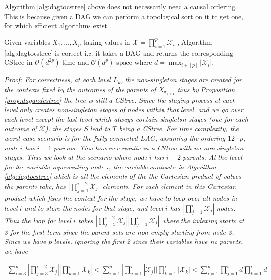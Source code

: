 \documentclass{tufte-book}
\begin{document}
Algorithm \ref{alg:dagtocstree} above does not necessarily need a causal ordering. This is because given a DAG we can perform a topological sort on it to get one, for which efficient algorithms exist \cite{tarjan-1976-edge-disjoin}.

\begin{theorem}\label{thm:dagtocstreecorrectness}
Given variables $X_1,...,X_p$ taking values in $\mathcal{X}=\prod_{i=1}^p \mathcal{X}_i$ , Algorithm \ref{alg:dagtocstree} is correct i.e. it takes a DAG and returns the corresponding CStree in $\mathcal{O}(d^{2p})$ time and $\mathcal{O}(d^p)$ space where $d = \max_{i \in [p]} |\mathcal{X}_i|$.
\end{theorem}

\textit{Proof:
	For correctness, at each level $L_k$, the non-singleton stages are created for the contexts fixed by the outcomes of the parents of $X_{\pi_{k+1}}$ thus by Proposition \ref{prop:dagandcstree} the tree is still a CStree. Since the staging process at each level only creates non-singleton stages of nodes within that level, and we go over each level except the last level which always contain singleton stages (one for each outcome of $\mathcal{X}$), the stages $S$ lead to $T$ being a CStree. For time complexity, the worst case scenario is for the fully connected DAG, assuming the ordering $12\cdots p$, node $i$ has $i-1$ parents. This however results in a CStree with no non-singleton stages. Thus we look at the scenario where node $i$ has $i-2$ parents. At the level for the variable representing node $i$, the variable $contexts$ in Algorithm \ref{alg:dagtocstree} which is all the elements of the the Cartesian product of values the parents take, has $|\prod_{j=1}^{i-2} \mathcal{X}_j|$ elements. For each element in this Cartesian product which fixes the context for the stage, we have to loop over all nodes in level $i$ and to store the nodes for that stage, and level $i$ has $|\prod_{j=1}^i \mathcal{X}_j|$ nodes. Thus the loop for level $i$ takes $|\prod_{j=3}^{i-2} \mathcal{X}_j ||\prod_{j=1}^i \mathcal{X}_j| $ where the indexing starts at 3 for the first term since the parent sets are non-empty starting from node 3. Since we have $p$ levels, ignoring the first 2 since their variables have no parents, we have}

	\begin{align*}\sum_{i=3}^p |\prod_{j=3}^{i-2} \mathcal{X}_j ||\prod_{k=1}^i \mathcal{X}_k| < \sum_{i=1}^p |\prod_{j=1}^i |\mathcal{X}_j||\prod_{k=1}^i |\mathcal{X}_k|< \sum_{i=1}^p \prod_{j=1}^i d \prod_{k=1}^i d 
	\end{align*}
\end{document}
